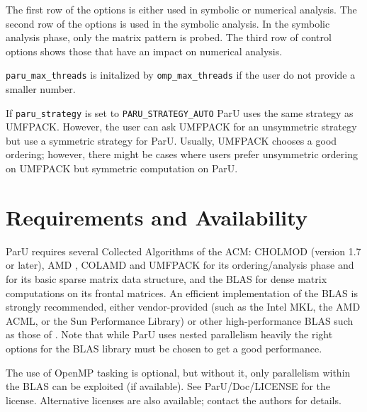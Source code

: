 \documentclass[12pt]{article}
\begin{document}
The first row of the options is either used in symbolic or numerical analysis.
The second row of the options is used in the symbolic analysis. In the symbolic
analysis phase, only the matrix pattern is probed.
The third row of control options shows those that have an impact on numerical
analysis.

\verb'paru_max_threads' is initalized by \verb'omp_max_threads' if the user do
not provide a smaller number.

If \verb'paru_strategy' is set to \verb'PARU_STRATEGY_AUTO' ParU uses the same
strategy as UMFPACK. However, the user can ask UMFPACK for an unsymmetric
strategy but use a symmetric strategy for ParU. Usually, UMFPACK chooses a good
ordering; however, there might be cases where users prefer unsymmetric ordering on
UMFPACK but symmetric computation on ParU.

\section{Requirements and Availability}
\label{summary}

ParU requires several Collected Algorithms of the ACM: CHOLMOD
\cite{ChenDavisHagerRajamanickam09,DavisHager09} (version 1.7 or later), AMD
\cite{AmestoyDavisDuff96,AmestoyDavisDuff03}, COLAMD
\cite{DavisGilbertLarimoreNg00_algo,DavisGilbertLarimoreNg00} and UMFPACK
\cite{10.1145/992200.992206} for its
ordering/analysis phase and for its basic sparse matrix data structure, and the
BLAS \cite{dddh:90} for dense matrix computations on its frontal matrices.
An efficient implementation of the BLAS is strongly recommended, either
vendor-provided (such as the Intel MKL, the AMD ACML, or the
Sun Performance Library) or other high-performance BLAS such as those of
\cite{GotoVanDeGeijn08}. Note that while ParU uses nested parallelism heavily
the right options for the BLAS library must be chosen to get a good performance.

The use of OpenMP tasking is optional, but
without it, only parallelism within the BLAS can be exploited (if available).
See ParU/Doc/LICENSE for the license.
Alternative licenses are also
available; contact the authors for details.




\end{document}
